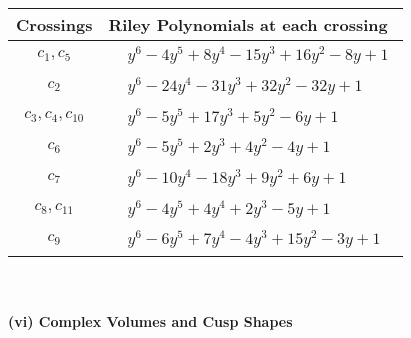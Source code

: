 \documentclass[1p]{elsarticle_modified}
\theoremstyle{definition}
\begin{document}
\begin{tabular}{m{50pt}|m{274pt}}
Crossings & \hspace{64pt}Riley Polynomials at each crossing \\
\hline $$\begin{aligned}c_{1},c_{5}\end{aligned}$$&$\begin{aligned}
&y^6-4 y^5+8 y^4-15 y^3+16 y^2-8 y+1
\end{aligned}$\\
\hline $$\begin{aligned}c_{2}\end{aligned}$$&$\begin{aligned}
&y^6-24 y^4-31 y^3+32 y^2-32 y+1
\end{aligned}$\\
\hline $$\begin{aligned}c_{3},c_{4},c_{10}\end{aligned}$$&$\begin{aligned}
&y^6-5 y^5+17 y^3+5 y^2-6 y+1
\end{aligned}$\\
\hline $$\begin{aligned}c_{6}\end{aligned}$$&$\begin{aligned}
&y^6-5 y^5+2 y^3+4 y^2-4 y+1
\end{aligned}$\\
\hline $$\begin{aligned}c_{7}\end{aligned}$$&$\begin{aligned}
&y^6-10 y^4-18 y^3+9 y^2+6 y+1
\end{aligned}$\\
\hline $$\begin{aligned}c_{8},c_{11}\end{aligned}$$&$\begin{aligned}
&y^6-4 y^5+4 y^4+2 y^3-5 y+1
\end{aligned}$\\
\hline $$\begin{aligned}c_{9}\end{aligned}$$&$\begin{aligned}
&y^6-6 y^5+7 y^4-4 y^3+15 y^2-3 y+1
\end{aligned}$\\
\hline
\end{tabular}\\~\\
\newpage\flushleft \textbf{(vi) Complex Volumes and Cusp Shapes}
\end{document}
